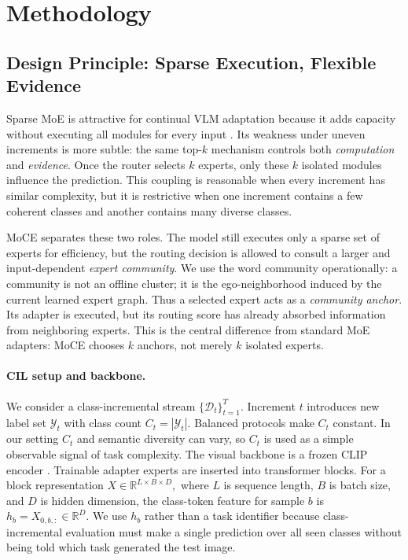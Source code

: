 \documentclass{article}
\theoremstyle{definition}
\theoremstyle{remark}
\begin{document}
\section{Methodology}
\subsection{Design Principle: Sparse Execution, Flexible Evidence}
Sparse MoE is attractive for continual VLM adaptation because it adds capacity without executing all modules for every input \cite{shazeer2017outrageously,fedus2022switch,yu2024boostingcontinuallearningvisionlanguage,11122658}. Its weakness under uneven increments is more subtle: the same top-$k$ mechanism controls both \emph{computation} and \emph{evidence}. Once the router selects $k$ experts, only these $k$ isolated modules influence the prediction. This coupling is reasonable when every increment has similar complexity, but it is restrictive when one increment contains a few coherent classes and another contains many diverse classes.

MoCE separates these two roles. The model still executes only a sparse set of experts for efficiency, but the routing decision is allowed to consult a larger and input-dependent \emph{expert community}. We use the word community operationally: a community is not an offline cluster; it is the ego-neighborhood induced by the current learned expert graph. Thus a selected expert acts as a \emph{community anchor}. Its adapter is executed, but its routing score has already absorbed information from neighboring experts. This is the central difference from standard MoE adapters: MoCE chooses $k$ anchors, not merely $k$ isolated experts.

\paragraph{CIL setup and backbone.}
We consider a class-incremental stream $\{\mathcal{D}_t\}_{t=1}^{T}$. Increment $t$ introduces new label set $\mathcal{Y}_t$ with class count $C_t=|\mathcal{Y}_t|$. Balanced protocols make $C_t$ constant. In our setting $C_t$ and semantic diversity can vary, so $C_t$ is used as a simple observable signal of task complexity. The visual backbone is a frozen CLIP encoder \cite{radford2021learning}. Trainable adapter experts are inserted into transformer blocks. For a block representation $ X\in\mathbb{R}^{L\times B\times D},
$ where $L$ is sequence length, $B$ is batch size, and $D$ is hidden dimension, the class-token feature for sample $b$ is
$
    h_b=X_{0,b,:}\in\mathbb{R}^{D}.
    \label{eq:cls_token}
$
We use $h_b$ rather than a task identifier because class-incremental evaluation must make a single prediction over all seen classes without being told which task generated the test image.
\end{document}
